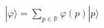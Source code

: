 \documentclass[preview]{standalone}
\begin{document}
\begin{align*}
|\varphi\rangle = \sum_{p\in\mathbb{R}} \varphi(p) |p\rangle
\end{align*}
\end{document}
